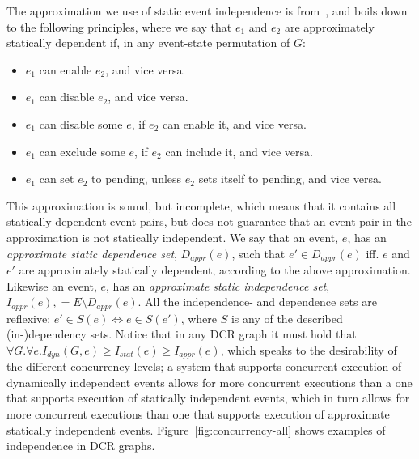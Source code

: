 \documentclass{article}
\begin{document}
			The approximation we use of static event independence is from~\cite{debois_concurrency_2015}, and boils down to the following principles, where we say that $e_1$ and $e_2$ are approximately statically dependent if, in any event-state permutation of $G$:
			\begin{itemize}
				\item $e_1$ can enable $e_2$, and vice versa.
				\item $e_1$ can disable $e_2$, and vice versa.
				\item $e_1$ can disable some $e$, if $e_2$ can enable it, and vice versa.
				\item $e_1$ can exclude some $e$, if $e_2$ can include it, and vice versa.
				\item $e_1$ can set $e_2$ to pending, unless $e_2$ sets itself to pending, and vice versa.
			\end{itemize}
			This approximation is sound, but incomplete, which means that it contains all statically dependent event pairs, but does not guarantee that an event pair in the approximation is not statically independent.
			We say that an event, $e$, has an \textit{approximate static dependence set}, $D_{appr}(e)$, such that $e' \in D_{appr}(e)$ iff. $e$ and $e'$ are approximately statically dependent, according to the above approximation.
			Likewise an event, $e$, has an \textit{approximate static independence set}, $I_{appr}(e),  = E \setminus D_{appr}(e)$.
			All the independence- and dependence sets are reflexive: $e' \in S(e) \iff e \in S(e')$, where $S$ is any of the described (in-)dependency sets.
			Notice that in any DCR graph it must hold that $\forall G. \forall e. I_{dyn}(G,e) \geq I_{stat}(e) \geq I_{appr}(e)$, which speaks to the desirability of the different concurrency levels; a system that supports concurrent execution of dynamically independent events allows for more concurrent executions than a one that supports execution of statically independent events, which in turn allows for more concurrent executions than one that supports execution of approximate statically independent events.
			Figure~\ref{fig:concurrency-all} shows examples of independence in DCR graphs.
\end{document}

